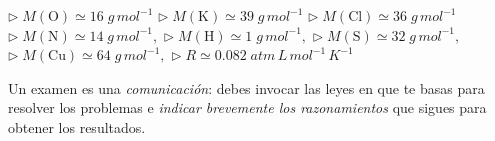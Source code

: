 \documentclass[a4paper,addpoints,14pt]{exam}
\newcommand*\chem[1]{\ensuremath{\mathrm{#1}}}
\begin{document}

\vspace*{\fill}

\hspace*{1cm}\begin{learn}
{$\triangleright\; M(\chem{O})\simeq16\;g\,mol^{-1}$\newline
$\triangleright\; M(\chem{K})\simeq 39\;g\,mol^{-1}$\newline
$\triangleright\; M(\chem{Cl})\simeq36\;g\,mol^{-1}$\newline
$\triangleright\; M(\chem{N})\simeq14\;g\,mol^{-1},$\newline
$\triangleright\; M(\chem{H})\simeq1\;g\,mol^{-1},$\newline
$\triangleright\; M(\chem{S})\simeq32\;g\,mol^{-1},$\newline
$\triangleright\; M(\chem{Cu})\simeq64\;g\,mol^{-1},$\newline
$\triangleright\; R\simeq 0.082\;atm\,L\,mol^{-1}\,K^{-1}$}
\end{learn}	



\newpage
\vspace*{-1cm}

\begin{problemas}{Un examen es una \textit{comunicación}: debes invocar las leyes en que te basas para resolver los problemas e \textit{indicar brevemente los razonamientos} que sigues para obtener los resultados.}
\end{problemas}
\vspace{1ex}

\end{document}
